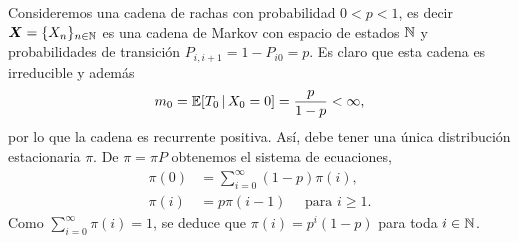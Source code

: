 \begin{example}
    Consideremos una cadena de rachas con probabilidad $0 < p < 1$, es decir $\bm X = \{X_n\}_{n \in \mathbb{N}}$ es una cadena de Markov con espacio de estados $\mathbb{N}$ y probabilidades de transición $P_{i,i+1} = 1 - P_{i0} = p$. Es claro que esta cadena es irreducible y además 
    \[
        m_0 = \mathbb{E}[T_0 \,\vert\, X_0 = 0] =  \frac{p}{1-p} < \infty,
    \]
    por lo que la cadena es recurrente positiva. Así, debe tener una única distribución estacionaria $\pi$. De $\pi = \pi P$ obtenemos el sistema de ecuaciones,
    \begin{align*}
        \pi(0) & = \sum_{i = 0}^\infty (1-p) \pi(i), \\
        \pi(i) & =  p \pi(i-1) \quad \text{ para } i \geq 1.
    \end{align*}
    Como $\sum_{i = 0}^\infty \pi(i) = 1$, se deduce que $\pi(i) = p^i (1-p)$ para toda $i \in \mathbb{N}$.
\end{example}

